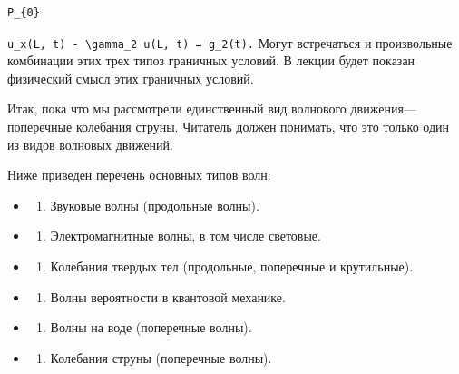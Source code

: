 \documentclass[
  ukrainian,
]{article}
\providecommand{\tightlist}{%
  \setlength{\itemsep}{0pt}\setlength{\parskip}{0pt}}
\begin{document}
\begin{verbatim}
P_{0}
\end{verbatim}

\texttt{u\_x(L,\ t)\ -\ \textbackslash{}gamma\_2\ u(L,\ t)\ =\ g\_2(t).}
Могут встречаться и произвольные комбинации этих трех типоз граничных
условий. В лекции будет показан физический смысл этих граничных условий.

Итак, пока что мы рассмотрели единственный вид волнового
движения---поперечные колебания струны. Читатель должен понимать, что
это только один из видов волновых движений.

Ниже приведен перечень основных типов волн:

\begin{itemize}
\tightlist
\item
  \begin{enumerate}
  \def\labelenumi{\arabic{enumi}.}
  \tightlist
  \item
    Звуковые волны (продольные волны).
  \end{enumerate}
\item
  \begin{enumerate}
  \def\labelenumi{\arabic{enumi}.}
  \setcounter{enumi}{1}
  \tightlist
  \item
    Электромагнитные волны, в том числе световые.
  \end{enumerate}
\item
  \begin{enumerate}
  \def\labelenumi{\arabic{enumi}.}
  \setcounter{enumi}{2}
  \tightlist
  \item
    Колебания твердых тел (продольные, поперечные и крутильные).
  \end{enumerate}
\item
  \begin{enumerate}
  \def\labelenumi{\arabic{enumi}.}
  \setcounter{enumi}{3}
  \tightlist
  \item
    Волны вероятности в квантовой механике.
  \end{enumerate}
\item
  \begin{enumerate}
  \def\labelenumi{\arabic{enumi}.}
  \setcounter{enumi}{4}
  \tightlist
  \item
    Волны на воде (поперечные волны).
  \end{enumerate}
\item
  \begin{enumerate}
  \def\labelenumi{\arabic{enumi}.}
  \setcounter{enumi}{5}
  \tightlist
  \item
    Колебания струны (поперечные волны).
  \end{enumerate}
\end{itemize}
\end{document}

